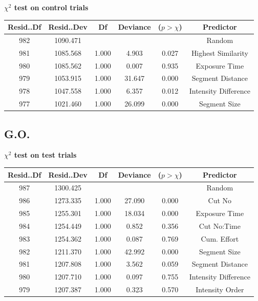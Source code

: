 \documentclass{article}
\begin{document}
\textbf{$\chi^2$ test on control trials}
\label{table:participantsAnovaEBControl}    
\begin{table}[ht]
    \centering    
    \begin{tabular}{cccccc}
    \hline
    Resid..Df & Resid..Dev &    Df & Deviance & ($p > \chi$) &    Predictor \\
    \hline
           982 &   1090.471 &       &          &            &             Random \\
      981 &   1085.568 & 1.000 &    4.903 &      0.027 & Highest Similarity \\
      980 &   1085.562 & 1.000 &    0.007 &      0.935 &          Exposure Time \\
      979 &   1053.915 & 1.000 &   31.647 &      0.000 &          Segment Distance \\
      978 &   1047.558 & 1.000 &    6.357 &      0.012 &         Intensity Difference \\
      977 &   1021.460 & 1.000 &   26.099 &      0.000 &          Segment Size \\
    \hline
    \end{tabular}    
\end{table}
\clearpage

\subsection*{G.O.}
\label{table:participantsAnovaGOTest}    
\textbf{$\chi^2$ test on test trials}
 
\begin{table}[ht]
    \centering    
    \begin{tabular}{cccccc}
    \hline
    Resid..Df & Resid..Dev &    Df & Deviance & ($p > \chi$) &    Predictor \\
    \hline
      987 &   1300.425 &       &          &            &       Random \\
      986 &   1273.335 & 1.000 &   27.090 &      0.000 &       Cut No \\
      985 &   1255.301 & 1.000 &   18.034 &      0.000 &    Exposure Time \\
      984 &   1254.449 & 1.000 &    0.852 &      0.356 &  Cut No:Time \\
      983 &   1254.362 & 1.000 &    0.087 &      0.769 & Cum. Effort \\
      982 &   1211.370 & 1.000 &   42.992 &      0.000 &    Segment Size \\
      981 &   1207.808 & 1.000 &    3.562 &      0.059 &    Segment Distance \\
      980 &   1207.710 & 1.000 &    0.097 &      0.755 &   Intensity Difference \\
      979 &   1207.387 & 1.000 &    0.323 &      0.570 &     Intensity Order \\
    \hline
    \end{tabular}    
\end{table}
\end{document}
